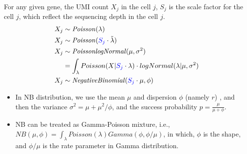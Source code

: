 \begin{frame}
  For any given gene, the UMI count \(X_j\) in the cell \(j\),   \(S_j\) is the
  scale factor for the cell \(j\), which reflect the sequencing depth in the
  cell \(j\). 
  \begin{align}
    X_{j} &\sim {\it Poisson}(\lambda) \\
    X_{j} &\sim {\it Poisson}(\textcolor{blue}{S_j}\cdot\tilde{\lambda}) \\
    X_{j} &\sim {\it PoissonlogNormal}(\mu, \sigma^2) \nonumber \\
         &= \int_{\lambda} Poisson(X|\textcolor{blue}{S_j}\cdot \lambda)\cdot logNormal(\lambda | \mu,\sigma^2) \\
    X_{j} &\sim {\it Negative Binomial} (\textcolor{blue}{S_j}\cdot\mu, \phi)
  \end{align}
  \begin{itemize}
\item
  In NB distribution, we use the mean \(\mu\) and
  dispersion \(\phi\) (namely \(r\)) , and then the variance \(\sigma^2 = \mu +
  \mu^2/\phi\), and the success probability \(p = \frac{\mu}{\mu + \phi}\).
\item
  NB can be treated as Gamma-Poisson mixture, i.e., \({\scriptstyle NB(\mu,\phi)=\int_\lambda
  Poisson(\lambda)Gamma(\phi, \phi/\mu)}\), in which, \(\phi\) is the shape, and
  \(\phi/\mu\) is the rate parameter in Gamma distribution.
\end{itemize}
\end{frame}


